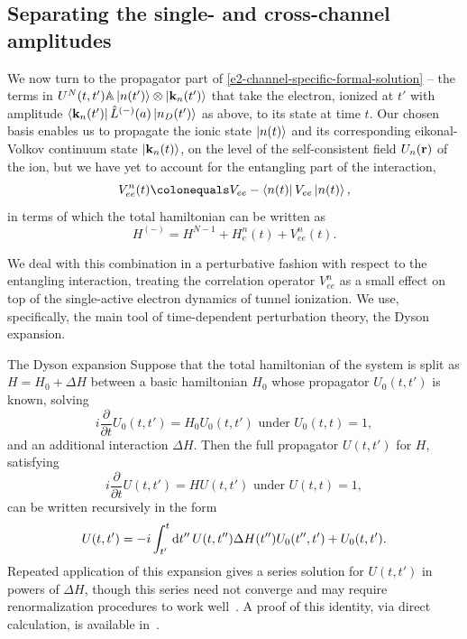 \subsection{Separating the single- and cross-channel amplitudes}
We now turn to the propagator part of \eqref{e2-channel-specific-formal-solution} -- the terms in $U^N(t,t')\mathbb{A}\ket{n(t')}\otimes\ket{\vb{k}_n(t')}$ that take the electron, ionized at $t'$ with amplitude $\bra{\vb{k}_n(t')}\hat{L}^{(-)}(a)\ket{n_D(t')}$ as above, to its state at time $t$. Our chosen basis enables us to propagate the ionic state $\ket{n(t)}$ and its corresponding eikonal-Volkov continuum state $\ket{\vb{k}_n(t)}$, on the level of the self-consistent field $U_n(\vb{r})$ of the ion, but we have yet to account for the entangling part of the interaction,
\begin{equation}
V_{ee}^n(t)\colonequals V_{ee}-\bra{n(t)}V_{ee}\ket{n(t)},
\label{e2-correlation-interaction-potential}
\end{equation}
in terms of which the total hamiltonian can be written as
\begin{equation}
H^{(-)}=H^{N-1}+H_e^n(t)+V_{ee}^n(t).
\end{equation}

We deal with this combination in a perturbative fashion with respect to the entangling interaction, treating the correlation operator $V_{ee}^n$ as a small effect on top of the single-active electron dynamics of tunnel ionization. We use, specifically, the main tool of time-dependent perturbation theory, the Dyson expansion.


\begin{mathaside}{The Dyson expansion}
\label{aside.dyson-expansion}
\noindent
Suppose that the total hamiltonian of the system is split as $H=H_0+\Delta H$ between a basic hamiltonian $H_0$ whose propagator $U_0(t,t')$ is known, solving 
\begin{equation}
i\frac{\partial}{\partial t} U_0(t,t')=H_0U_0(t,t')\textrm{  under  }U_0(t,t)=1,
\end{equation}
and an additional interaction $\Delta H$. Then the full propagator $U(t,t')$ for $H$, satisfying
\begin{equation}
i\frac{\partial}{\partial t} U(t,t')=HU(t,t')\textrm{  under  }U(t,t)=1,
\end{equation}
can be written recursively in the form 
\begin{equation}
U(t,t')=-i\int_{t'}^t \mathrm{d} t'' \, U(t,t'') \Delta H(t'') U_0(t'',t')+U_0(t,t').
\label{e2-dyson-expansion}
\end{equation}
Repeated application of this expansion gives a series solution for $U(t,t')$ in powers of $\Delta H$, though this series need not converge and may require renormalization procedures to work well~\cite{fetter_walecka}. A proof of this identity, via direct calculation, is available in~.
\end{mathaside}


